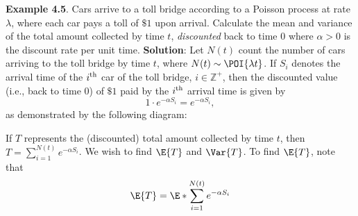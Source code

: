 \begin{Example}
    \textbf{Example 4.5}. Cars arrive to a toll bridge according to a Poisson process at rate $ \lambda $, where each
    car pays a toll of $\$1$ upon arrival. Calculate the mean and variance of the total amount
    collected by time $t$, \emph{discounted} back to time $0$ where $ \alpha>0 $ is the discount rate per unit time.
    \tcblower{}
    \textbf{Solution}: Let $ N(t) $ count the number of cars arriving to the toll
    bridge by time $ t $, where $ N(t) \sim \POI{\lambda t} $. If
    $ S_i $ denotes the arrival time of the $ i\textsuperscript{th} $
    car of the toll bridge, $ i\in\mathbb{Z}^+ $, then the discounted
    value (i.e., back to time $ 0 $) of $\$1$ paid by the $ i\textsuperscript{th} $
    arrival time is given by
    \[ 1\cdot e^{-\alpha S_i}=e^{-\alpha S_i}, \]
    as demonstrated by the following diagram:
    \begin{center}
    \end{center}
    If $ T $ represents the (discounted) total amount collected by time $ t $,
    then $ T=\sum_{i=1}^{N(t)}e^{-\alpha S_i} $. We wish to find
    $ \E{T} $ and $ \Var{T} $. To find $ \E{T} $, note that
    \begin{align*}
        \E{T}
         & =\E*{\sum_{i=1}^{N(t)}e^{-\alpha S_i}}                                                                                    \\

\end{align*}
\end{Example}
